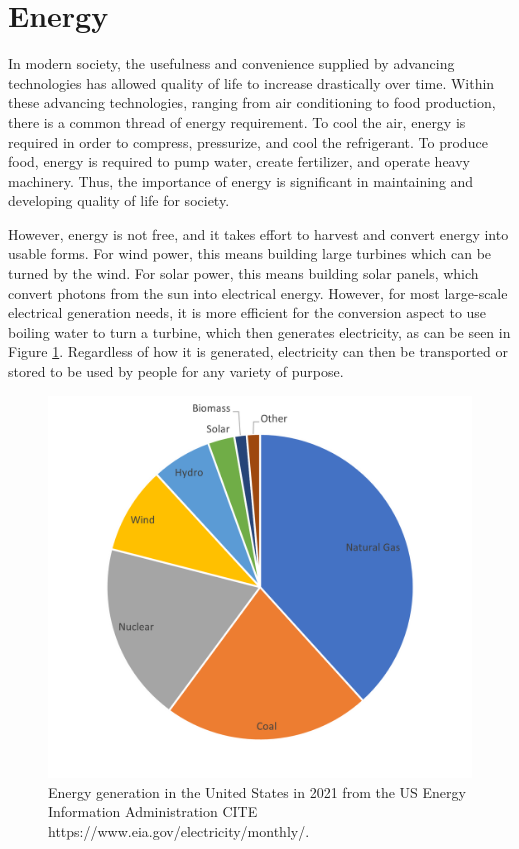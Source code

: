 
\renewcommand*\descriptionlabel[1]{\hspace\leftmargin$#1$}
\setcounter{tocdepth}{5}
\setcounter{secnumdepth}{5}
\newcommand{\minus}{\scalebox{0.65}[1.0]{$-$}}

\section{Energy}

In modern society, the usefulness and convenience supplied by advancing technologies has allowed quality of life to increase drastically over time. Within these advancing technologies, ranging from air conditioning to food production, there is a common thread of energy requirement. To cool the air, energy is required in order to compress, pressurize, and cool the refrigerant. To produce food, energy is required to pump water, create fertilizer, and operate heavy machinery. Thus, the importance of energy is significant in maintaining and developing quality of life for society.

However, energy is not free, and it takes effort to harvest and convert energy into usable forms. For wind power, this means building large turbines which can be turned by the wind. For solar power, this means building solar panels, which convert photons from the sun into electrical energy. However, for most large-scale electrical generation needs, it is more efficient for the conversion aspect to use boiling water to turn a turbine, which then generates electricity, as can be seen in Figure \ref{fig:energy-gen-methods}. Regardless of how it is generated, electricity can then be transported or stored to be used by people for any variety of purpose. 

\begin{figure}[H]
  \centering
  \includegraphics[scale=0.7]{images/US-energy-prod.png}
  \caption{Energy generation in the United States in 2021 from the US Energy Information Administration CITE https://www.eia.gov/electricity/monthly/.}
   \label{fig:energy-gen-methods}
\end{figure}

